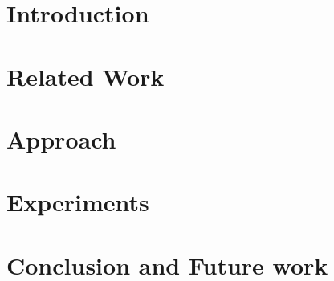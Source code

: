 \documentclass[12pt,twoside,openright]{report}
\makeatletter
\def\cleardoublepage{\clearpage\if@twoside \ifodd\c@page\else
    \hbox{}
    \thispagestyle{empty}
    \newpage
    \if@twocolumn\hbox{}\newpage\fi\fi\fi}
\makeatother
\begin{document}

\cleardoublepage


%


\cleardoublepage


\tableofcontents

\chapter{Introduction}


\chapter{Related Work}


\chapter{Approach}


\chapter{Experiments}


%

\chapter{Conclusion and Future work}





%

%
%
%
\end{document}
